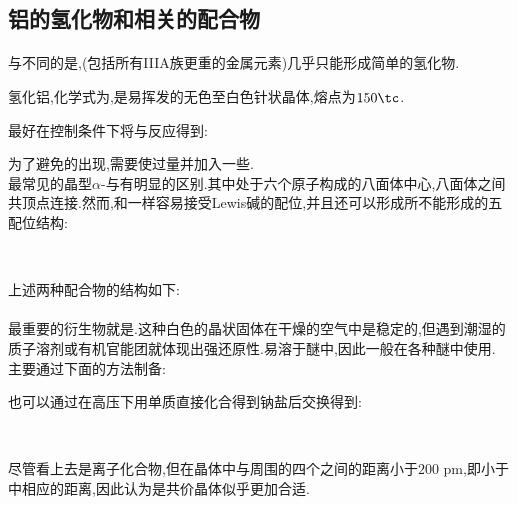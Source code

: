 \documentclass{ctexart}
\begin{document}
\subsection{铝的氢化物和相关的配合物}
\paragraph{}
与不同的是,(包括所有IIIA族更重的金属元素)几乎只能形成简单的氢化物.
\begin{substance}[\ce{AlH3}]
    氢化铝,化学式为,是易挥发的无色至白色针状晶体,熔点为$150\tc$.
\end{substance}
最好在控制条件下将与反应得到:
\begin{center}
\end{center}
为了避免的出现,需要使过量并加入一些.\\
\indent {}最常见的晶型$\alpha$-与有明显的区别.其中处于六个原子构成的八面体中心,八面体之间共顶点连接.然而,和一样容易接受Lewis碱的配位,并且还可以形成所不能形成的五配位结构:
\begin{center}
    \\
\end{center}
上述两种配合物的结构如下:
\paragraph{}
最重要的衍生物就是.这种白色的晶状固体在干燥的空气中是稳定的,但遇到潮湿的质子溶剂或有机官能团就体现出强还原性.易溶于醚中,因此一般在各种醚中使用.\\
\indent {}主要通过下面的方法制备:
\begin{center}
\end{center}
也可以通过在高压下用单质直接化合得到钠盐后交换得到:
\begin{center}
    \\
\end{center}
尽管看上去是离子化合物\ce{[Li]+[AlH4]-},但在晶体中与周围的四个之间的距离小于$200\text{ pm}$,即小于中相应的距离,因此认为是共价晶体似乎更加合适.
\end{document}
